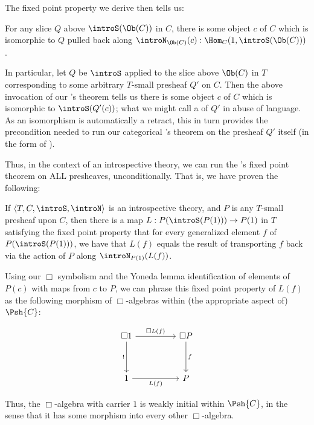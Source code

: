 The fixed point property we derive then tells us:

\begin{theorem}\label{ObjectToSetFixedPoint}
For any slice $Q$ above $\introS(\Ob(C))$ in $C$, there is some object $c$ of $C$ which is isomorphic to $Q$ pulled back along $\introN_{\Ob(C)}(c) : \Hom_C(1, \introS(\Ob(C)))$.
\end{theorem}

In particular, let $Q$ be $\introS$ applied to the slice above $\Ob(C)$ in $T$ corresponding to some arbitrary $T$-small presheaf $Q'$ on $C$. Then the above invocation of our \Loeb's theorem tells us there is some object $c$ of $C$ which is isomorphic to $\introS(Q'(c))$; what we might call a  of $Q'$ in abuse of language. As an isomorphism is automatically a retract, this in turn provides the precondition needed to run our categorical \Loeb's theorem on the presheaf $Q'$ itself (in the form of ).

Thus, in the context of an introspective theory, we can run the \Loeb's fixed point theorem on ALL presheaves, unconditionally. That is, we have proven the following:

\label{LoebInIntrosp}
If $\langle T, C, \introS, \introN \rangle$ is an introspective theory, and $P$ is any $T$-small presheaf upon $C$, then there is a map $L : P(\introS(P(1))) \to P(1)$ in $T$ satisfying the fixed point property that for every generalized element $f$ of $P(\introS(P(1)))$, we have that $L(f)$ equals the result of transporting $f$ back via the action of $P$ along $\introN_{P(1)}(L(f))$.

Using our $\Box$ symbolism and the Yoneda lemma identification of elements of $P(c)$ with maps from $c$ to $P$, we can phrase this fixed point property of $L(f)$ as the following morphism of $\Box$-algebras within (the appropriate aspect of) $\Psh{C}$:

\[\begin{tikzcd}
	{\Box 1} && {\Box P} \\
	\\
	1 && P
	\arrow["f", from=1-3, to=3-3]
	\arrow["{!}"', from=1-1, to=3-1]
	\arrow["{\Box L(f)}", from=1-1, to=1-3]
	\arrow["{L(f)}"', from=3-1, to=3-3]
\end{tikzcd}\]

Thus, the $\Box$-algebra with carrier $1$ is weakly initial within $\Psh{C}$, in the sense that it has some morphism into every other $\Box$-algebra.

